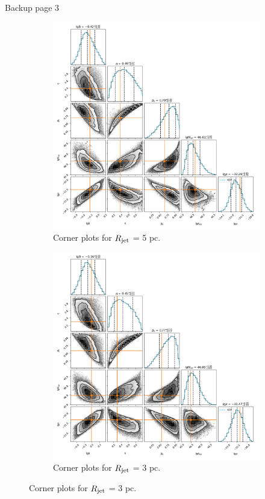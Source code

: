 \documentclass[10pt,aspectratio=169,mathserif]{beamer}
\begin{document}
\begin{frame}{Backup page 3}
    \begin{figure}[ht]
    \centering
    \begin{subfigure}[t]{0.4\linewidth}
        \includegraphics[width=\linewidth]{5pc.png}
        \caption{Corner plots for $R_{\rm jet}$ = 5 pc.}
        \label{fig:sub1}
    \end{subfigure}%
    \hfill %
    \begin{subfigure}[t]{0.4\linewidth}
        \includegraphics[width=\linewidth]{3pc.png}
        \caption{Corner plots for $R_{\rm jet}$ = 3 pc.}
        \label{fig:sub2}
    \end{subfigure}%
    \end{figure}
\end{frame}
\end{document}
